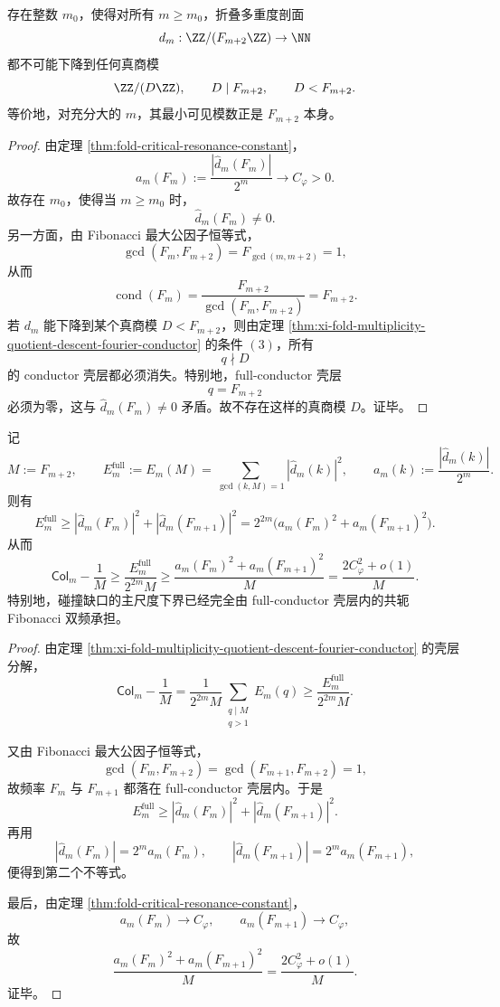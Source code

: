\begin{corollary}\label{cor:xi-fold-multiplicity-fullmodulus-primitive}
存在整数 \(m_0\)，使得对所有 \(m\ge m_0\)，折叠多重度剖面
\[
d_m:\ZZ/(F_{m+2}\ZZ)\to\NN
\]
都不可能下降到任何真商模
\[
\ZZ/(D\ZZ),
\qquad
D\mid F_{m+2},
\qquad
D<F_{m+2}.
\]
等价地，对充分大的 \(m\)，其最小可见模数正是 \(F_{m+2}\) 本身。
\end{corollary}
\begin{proof}
由定理 \ref{thm:fold-critical-resonance-constant}，
\[
a_m(F_m):=\frac{|\widehat d_m(F_m)|}{2^m}\longrightarrow C_\varphi>0.
\]
故存在 \(m_0\)，使得当 \(m\ge m_0\) 时，
\[
\widehat d_m(F_m)\neq 0.
\]
另一方面，由 Fibonacci 最大公因子恒等式，
\[
\gcd(F_m,F_{m+2})=F_{\gcd(m,m+2)}=1,
\]
从而
\[
\operatorname{cond}(F_m)=\frac{F_{m+2}}{\gcd(F_m,F_{m+2})}=F_{m+2}.
\]
若 \(d_m\) 能下降到某个真商模 \(D<F_{m+2}\)，则由定理
\ref{thm:xi-fold-multiplicity-quotient-descent-fourier-conductor} 的条件 \((3)\)，所有
\[
q\nmid D
\]
的 conductor 壳层都必须消失。特别地，full-conductor 壳层
\[
q=F_{m+2}
\]
必须为零，这与 \(\widehat d_m(F_m)\neq 0\) 矛盾。故不存在这样的真商模 \(D\)。证毕。
\end{proof}

\begin{theorem}\label{thm:xi-full-conductor-shell-collision-gap-fibonacci-pair}
记
\[
M:=F_{m+2},
\qquad
E_m^{\mathrm{full}}:=E_m(M)=\sum_{\gcd(k,M)=1}|\widehat d_m(k)|^2,
\qquad
a_m(k):=\frac{|\widehat d_m(k)|}{2^m}.
\]
则有
\[
E_m^{\mathrm{full}}
\ge
|\widehat d_m(F_m)|^2+|\widehat d_m(F_{m+1})|^2
=
2^{2m}\bigl(a_m(F_m)^2+a_m(F_{m+1})^2\bigr).
\]
从而
\[
\mathsf{Col}_m-\frac1M
\ge
\frac{E_m^{\mathrm{full}}}{2^{2m}M}
\ge
\frac{a_m(F_m)^2+a_m(F_{m+1})^2}{M}
=
\frac{2C_\varphi^2+o(1)}{M}.
\]
特别地，碰撞缺口的主尺度下界已经完全由 full-conductor 壳层内的共轭 Fibonacci 双频承担。
\end{theorem}
\begin{proof}
由定理 \ref{thm:xi-fold-multiplicity-quotient-descent-fourier-conductor} 的壳层分解，
\[
\mathsf{Col}_m-\frac1M
=
\frac{1}{2^{2m}M}\sum_{\substack{q\mid M\\ q>1}}E_m(q)
\ge
\frac{E_m^{\mathrm{full}}}{2^{2m}M}.
\]

又由 Fibonacci 最大公因子恒等式，
\[
\gcd(F_m,F_{m+2})=\gcd(F_{m+1},F_{m+2})=1,
\]
故频率 \(F_m\) 与 \(F_{m+1}\) 都落在 full-conductor 壳层内。于是
\[
E_m^{\mathrm{full}}
\ge
|\widehat d_m(F_m)|^2+|\widehat d_m(F_{m+1})|^2.
\]
再用
\[
|\widehat d_m(F_m)|=2^m a_m(F_m),
\qquad
|\widehat d_m(F_{m+1})|=2^m a_m(F_{m+1}),
\]
便得到第二个不等式。

最后，由定理 \ref{thm:fold-critical-resonance-constant}，
\[
a_m(F_m)\to C_\varphi,
\qquad
a_m(F_{m+1})\to C_\varphi,
\]
故
\[
\frac{a_m(F_m)^2+a_m(F_{m+1})^2}{M}
=
\frac{2C_\varphi^2+o(1)}{M}.
\]
证毕。
\end{proof}

